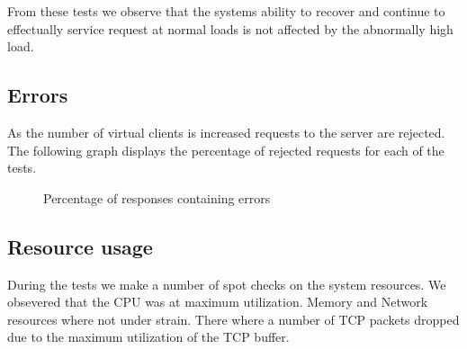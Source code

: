 From these tests we observe that the systems ability to recover and continue to effectually service request at normal loads is not affected by the abnormally high load.


\subsection*{Errors} 
As the number of virtual clients is increased requests to the server are rejected. The following graph displays the percentage of rejected requests for each of the tests.

\begin{figure}[h]
\centering
{}
\caption{Percentage of responses containing errors}
\label{fig:5.3}
\end{figure}

\subsection*{Resource usage} 
During the tests we make a number of spot checks on the system resources.  We obsevered that the CPU was at maximum utilization.  Memory and Network resources where not under strain.  There where a number of TCP packets dropped due to the maximum utilization of the TCP buffer. 

